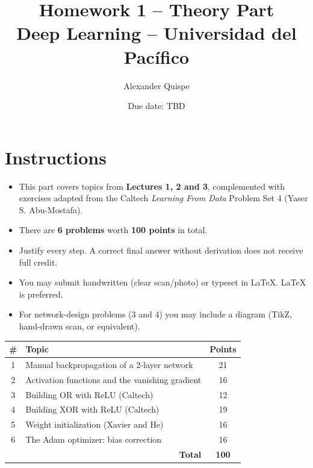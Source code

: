 \documentclass[11pt,letterpaper]{article}
\title{\vspace{-1.5cm}\textbf{Homework 1 -- Theory Part}\\[0.3em]
       \large Deep Learning -- Universidad del Pac\'ifico}
\author{Alexander Quispe}
\date{Due date: TBD}
\begin{document}
\maketitle
\thispagestyle{fancy}

\section*{Instructions}

\begin{itemize}[leftmargin=1.5em]
  \item This part covers topics from \textbf{Lectures 1, 2 and 3}, complemented
        with exercises adapted from the Caltech \emph{Learning From Data}
        Problem Set 4 (Yaser S. Abu-Mostafa).
  \item There are \textbf{6 problems} worth \textbf{100 points} in total.
  \item Justify every step. A correct final answer without derivation does not
        receive full credit.
  \item You may submit handwritten (clear scan/photo) or typeset in LaTeX.
        LaTeX is preferred.
  \item For network-design problems (3 and 4) you may include a diagram
        (TikZ, hand-drawn scan, or equivalent).
\end{itemize}

\begin{center}
\begin{tabular}{|c|l|c|}
\hline
\textbf{\#} & \textbf{Topic} & \textbf{Points} \\
\hline
1 & Manual backpropagation of a 2-layer network        & 21 \\
2 & Activation functions and the vanishing gradient    & 16 \\
3 & Building OR with ReLU (Caltech)                    & 12 \\
4 & Building XOR with ReLU (Caltech)                   & 19 \\
5 & Weight initialization (Xavier and He)              & 16 \\
6 & The Adam optimizer: bias correction                & 16 \\
\hline
\multicolumn{2}{|r|}{\textbf{Total}} & \textbf{100} \\
\hline
\end{tabular}
\end{center}

\hrulefill

\end{document}
